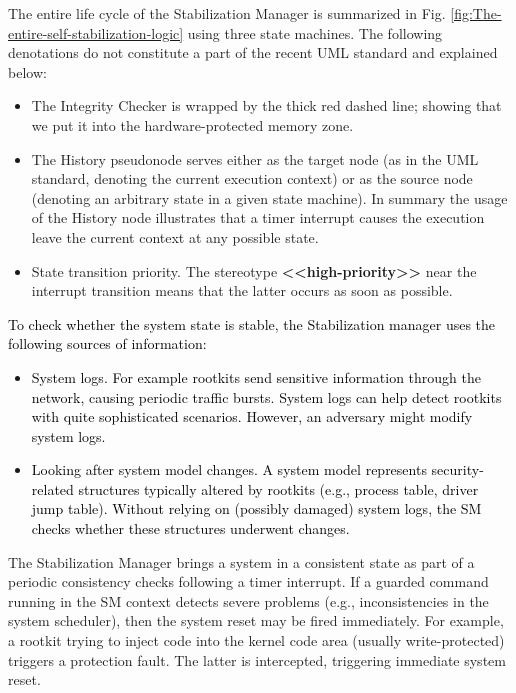 The entire life cycle of the Stabilization Manager is summarized in
Fig. \ref{fig:The-entire-self-stabilization-logic} using three state
machines. The following denotations do not constitute a part of the
recent UML standard \cite{uml-spec} and explained below: 
\begin{itemize}
\item The Integrity Checker is wrapped by the thick red dashed line; showing
that we put it into the hardware-protected memory zone. 
\item The History pseudonode serves either as the target node (as in the
UML standard, denoting the current execution context) or as the source
node (denoting an arbitrary state in a given state machine). In summary
the usage of the History node illustrates that a timer interrupt causes
the execution leave the current context at any possible state. 
\item State transition priority. The stereotype \textbf{<\textcompwordmark{}<high-priority>\textcompwordmark{}>}
near the interrupt transition means that the latter occurs as soon
as possible. 
\end{itemize}
\textcolor{black}{To check whether the system state is stable, the
Stabilization manager uses the following sources of information:}
\begin{itemize}
\item \textcolor{black}{System logs. For example rootkits send sensitive
information through the network, causing periodic traffic bursts.
System logs can help detect rootkits with quite sophisticated scenarios.
However, an adversary might modify system logs.}
\item \textcolor{black}{Looking after system model changes. A system model
represents security-related structures typically altered by rootkits
(e.g., process table, driver jump table). Without relying on (possibly
damaged) system logs, the SM checks whether these structures underwent
changes.}
\end{itemize}
The Stabilization Manager brings a system in a consistent state as
part of a periodic consistency checks following a timer interrupt.
If a guarded command running in the SM context detects severe problems
(e.g., inconsistencies in the system scheduler), then the system reset
may be fired immediately. For example, a rootkit trying to inject
code into the kernel code area (usually write-protected) triggers
a protection fault. The latter is intercepted, triggering immediate
system reset. 

